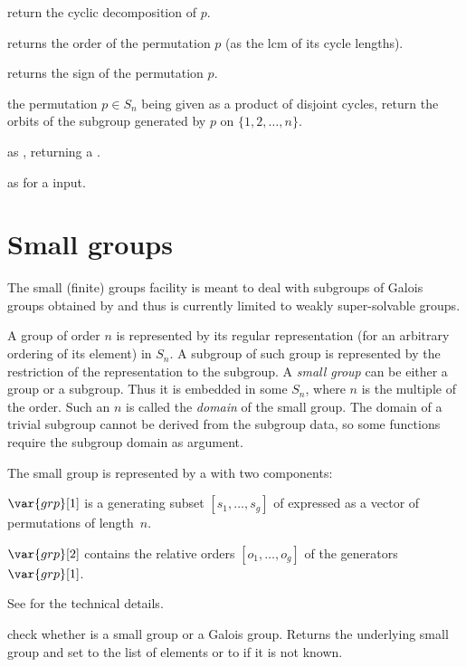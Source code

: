  return the cyclic decomposition of $p$.

 returns the order of the permutation $p$
(as the lcm of its cycle lengths).

 returns the sign of the permutation $p$.

 the permutation $p\in S_n$ being
given as a product of disjoint cycles, return the orbits of the subgroup
generated by $p$ on $\{1,2,\ldots,n\}$.

 as , returning a
.

 as  for a  input.

\section{Small groups}

The small (finite) groups facility is meant to deal with subgroups of Galois
groups obtained by  and thus is currently limited to weakly
super-solvable groups.

A group  of order $n$ is represented by its regular representation
(for an arbitrary ordering of its element) in $S_n$.  A subgroup of such group
is represented by the restriction of the representation to the subgroup.
A \emph{small group} can be either a group or a subgroup. Thus it is embedded
in some $S_n$, where $n$ is the multiple of the order. Such an $n$ is called
the \emph{domain} of the small group. The domain of a trivial subgroup cannot
be derived from the subgroup data, so some functions require the subgroup
domain as argument.

The small group  is represented by a  with two
components:

$\var{grp}[1]$ is a generating subset $[s_1,\ldots,s_g]$ of 
expressed as a vector of permutations of length~$n$.

$\var{grp}[2]$ contains the relative orders $[o_1,\ldots,o_g]$ of
the generators $\var{grp}[1]$.

See  for the technical details.

 check whether  is a
small group or a Galois group. Returns the underlying small
group and set  to the list of elements or to  if it is not
known.

